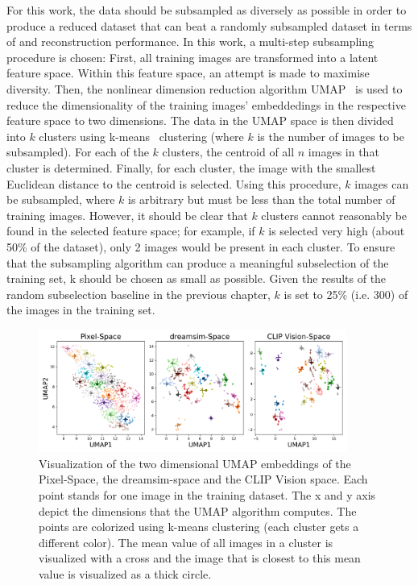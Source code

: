For this work, the data should be subsampled as diversely as possible in order to produce a reduced dataset that can beat a randomly subsampled dataset in terms of  and reconstruction performance. In this work, a multi-step subsampling procedure is chosen: First, all training images are transformed into a latent feature space. Within this feature space, an attempt is made to maximise diversity. Then, the nonlinear dimension reduction algorithm UMAP~\cite{mcinnesUMAPUniformManifold2018} is used to reduce the dimensionality of the training images' embeddedings in the respective feature space to two dimensions. The data in the UMAP space is then divided into $k$ clusters using k-means~\cite{1056489} clustering (where $k$ is the number of images to be subsampled). For each of the $k$ clusters, the centroid of all $n$ images in that cluster is determined. Finally, for each cluster, the image with the smallest Euclidean distance to the centroid is selected. Using this procedure, $k$ images can be subsampled, where $k$ is arbitrary but must be less than the total number of training images. However, it should be clear that $k$ clusters cannot reasonably be found in the selected feature space; for example, if $k$ is selected very high (about 50\% of the dataset), only 2 images would be present in each cluster. To ensure that the subsampling algorithm can produce a meaningful subselection of the training set, k should be chosen as small as possible. Given the results of the random subselection baseline in the previous chapter, $k$ is set to 25\% (i.e. 300) of the images in the training set. 

\begin{figure}[ht]
    \centering
    \includegraphics[width=0.9\textwidth]{plots/dropout_umap.png}
    \caption[UMAP visualization of diversity based subsampling]{Visualization of the two dimensional UMAP embeddings of the Pixel-Space, the dreamsim-space and the CLIP Vision space. Each point stands for one image in the training dataset. The x and y axis depict the dimensions that the UMAP algorithm computes. The points are colorized using k-means clustering (each cluster gets a different color). The mean value of all images in a cluster is visualized with a cross and the image that is closest to this mean value is visualized as a thick circle.}\label{fig:dropout_umap}
\end{figure}


